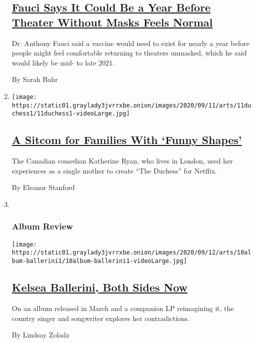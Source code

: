 \begin{enumerate}
{  \subsection{\texorpdfstring{\href{/2020/09/11/theater/fauci-theater-reopen.html}{Fauci
  Says It Could Be a Year Before Theater Without Masks Feels
  Normal}}{Fauci Says It Could Be a Year Before Theater Without Masks Feels Normal}}\label{fauci-says-it-could-be-a-year-before-theater-without-masks-feels-normal}}

  Dr. Anthony Fauci said a vaccine would need to exist for nearly a year
  before people might feel comfortable returning to theaters unmasked,
  which he said would likely be mid- to late 2021.

  By Sarah Bahr
\item
  \texttt{[image: https://static01.graylady3jvrrxbe.onion/images/2020/09/11/arts/11duchess1/11duchess1-videoLarge.jpg]}

  \hypertarget{a-sitcom-for-families-with-funny-shapes}{%
  \subsection{\texorpdfstring{\href{/2020/09/11/arts/television/katherine-ryan-duchess.html}{A
  Sitcom for Families With `Funny
  Shapes'}}{A Sitcom for Families With `Funny Shapes'}}\label{a-sitcom-for-families-with-funny-shapes}}

  The Canadian comedian Katherine Ryan, who lives in London, used her
  experiences as a single mother to create ``The Duchess'' for Netflix.

  By Eleanor Stanford
\item ~
  \hypertarget{album-review}{%
  \subsubsection{Album Review}\label{album-review}}

  \texttt{[image: https://static01.graylady3jvrrxbe.onion/images/2020/09/12/arts/10album-ballerini1/10album-ballerini1-videoLarge.jpg]}

  \hypertarget{kelsea-ballerini-both-sides-now}{%
  \subsection{\texorpdfstring{\href{/2020/09/11/arts/music/kelsea-ballerini-review.html}{Kelsea
  Ballerini, Both Sides
  Now}}{Kelsea Ballerini, Both Sides Now}}\label{kelsea-ballerini-both-sides-now}}

  On an album released in March and a companion LP reimagining it, the
  country singer and songwriter explores her contradictions.

  By Lindsay Zoladz
\end{enumerate}

